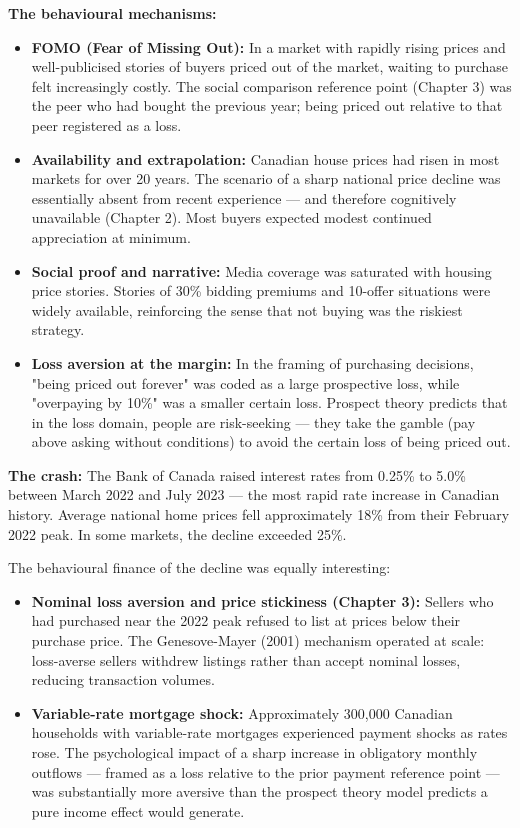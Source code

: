 \documentclass[12pt, letterpaper]{article}
\begin{document}
\textbf{The behavioural mechanisms:}
\begin{itemize}
\item \textbf{FOMO (Fear of Missing Out):} In a market with rapidly rising prices and well-publicised stories of buyers priced out of the market, waiting to purchase felt increasingly costly. The social comparison reference point (Chapter 3) was the peer who had bought the previous year; being priced out relative to that peer registered as a loss.
\item \textbf{Availability and extrapolation:} Canadian house prices had risen in most markets for over 20 years. The scenario of a sharp national price decline was essentially absent from recent experience --- and therefore cognitively unavailable (Chapter 2). Most buyers expected modest continued appreciation at minimum.
\item \textbf{Social proof and narrative:} Media coverage was saturated with housing price stories. Stories of 30\% bidding premiums and 10-offer situations were widely available, reinforcing the sense that not buying was the riskiest strategy.
\item \textbf{Loss aversion at the margin:} In the framing of purchasing decisions, "being priced out forever" was coded as a large prospective loss, while "overpaying by 10\%" was a smaller certain loss. Prospect theory predicts that in the loss domain, people are risk-seeking --- they take the gamble (pay above asking without conditions) to avoid the certain loss of being priced out.
\end{itemize}

\textbf{The crash:} The Bank of Canada raised interest rates from 0.25\% to 5.0\% between March 2022 and July 2023 --- the most rapid rate increase in Canadian history. Average national home prices fell approximately 18\% from their February 2022 peak. In some markets, the decline exceeded 25\%.

The behavioural finance of the decline was equally interesting:
\begin{itemize}
\item \textbf{Nominal loss aversion and price stickiness (Chapter 3):} Sellers who had purchased near the 2022 peak refused to list at prices below their purchase price. The Genesove-Mayer (2001) mechanism operated at scale: loss-averse sellers withdrew listings rather than accept nominal losses, reducing transaction volumes.
\item \textbf{Variable-rate mortgage shock:} Approximately 300,000 Canadian households with variable-rate mortgages experienced payment shocks as rates rose. The psychological impact of a sharp increase in obligatory monthly outflows --- framed as a loss relative to the prior payment reference point --- was substantially more aversive than the prospect theory model predicts a pure income effect would generate.
\end{itemize}
\end{document}
